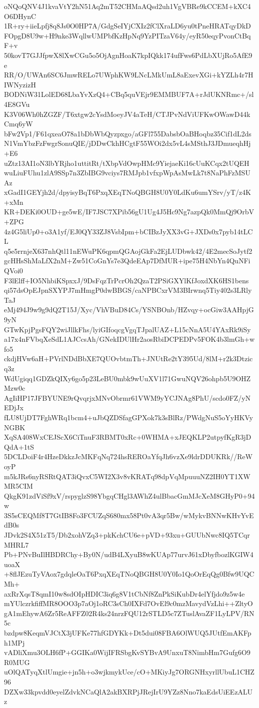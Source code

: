 oNQoQNV4J1kvaVtY2hN51Aq2mT52CHMaAQsd2uh1VgVBRe9kCCEM+kXC4O6DHynC
1R+ry+iieLpfj8q8Js0O0HP7A/GdgSeIYjCXIz2fClXraLD6yu0tPneHRATqyDkD
FOpgD8U9w+H9nke3WqllwUMPbfKzHpNq9YzPITzaV64y/eyR50eqyPvonCtBqF+v
50kovT7GJJfpwX8lXwCGu5o5OjAgnHoaK7kpIQkk174ufFws6PdLbXUjRo5AfE9e
RR/O/UWAn6SC6JmwRELo7UWphKW9LNcLMkUmL8aExevXGi+kYZLh4r7HIWNyzizH
BODNiW31LolED68LbaYvXzQ4+CBq5quVEjr9EMMBUF7A+rJdUKNRmc+/sl4E8GVu
K3V06Wh0hZGZF/T6xtgw2cYsdMoeyJV4aTeH/CTJPvNdViUFKwOWawD44kCmq6yW
bFw2Vp1/F61qxeaO78a1bDbWbQyzpxgo/aGFl755DabsbOaBHoqbz35Cif1dL2ds
N1VmYbzFzFwgrSonuQIE/jDDwCkhHCgtF55WOi2dx5vL4sMSthJ3JDmueqhHj+E6
uZtz13AI1oN3lbYRjho1uttitRt/tXbpVdOwpHMc9YiejaeKi16cUuKCqx2tUQEH
wuLiuFUhu1zlA9SSp7n3ZbIBG9vciys7RMJpb1vfxpWpAsMwLk7t8NaPhFzMSUAz
xGadI1GEYjh2d/dpyisyBqT6PxqXEqTNoQBGH8U0Y0LdKu6umYSrv/yT/z4K+xMn
KR+DEKi0OUD+ge5wE/IF7JSC7XPib56gU1Ug4J5Hc9Ng7azpQk0MmQj9OrbV+ZPG
4z4G5liUp0+o3A1yf/EJ0QY33ZJ8VsbIpm+bCIBzJyXX3vG+JXDs0x7pyb14tLCL
q5e5rrnjeX637nhQtl11nEWuPK6qpmQGAojGkFa2EjLUDbwk42/4E2mecSoJytf2
gcHHsShMaLfX2nM+Zw51CoGnYs7e3QdeEAp7DfMUR+ipe75H4NbYn4QuNFiQVoi0
F3lElff+IO5NhbiKSpxxJ/9DsFqzTrPcrOh2QzaT2PSiGXYlKfJoxdXK6HS1bens
qi57dsOpEJpnSXYPJ7mHmgP0dwBBGS/caNPBCxrVM3BIrwnq5Tiy402s3LRlyTaJ
eMj494J9w9g9dQ2T15J/Xyc/VhVBuD84Cs/YSNBOnb/HZvqy+ocGiw3AAHpjG9yN
GTwKpjPgsFQY2wiJllkFhs/lyiGIfoqcgVgqTJpalUAZ+L15cNnA5U4YAxRk9iSy
a17x4nFVbqXeSdL1AJCcsAh/GNekIDUlHr2aosRbiDCPEDPv5FOK4b3lmGh+wfo5
ckdjHVw6aH+PVrlNDdBbXE7QUOvbtmTh+JNUtRe2tY395Ud/8lM+r2k3Dtzicq3z
WdUgiqq1GDZkQIXy6go5p23LeBU0mbk9wUuXV1l71GwuNQV26ohpb5U9OHZMzw0c
AgIiHP17JFBYUNE9rQvqrjxMNvObrmr61VWM9yYCJNAg8PhU/scdo0FZ/yNEDjJx
fLU8UjDT7FghWRq1bcm4+uJbQZDSfagGPXok7k3sBlRz/PWdgNuS5oYyHKVyNGBK
XqSA408WxCEJScX6CiTnuF3RBMT0xRc+0WHMA+xJEQKLP2utpyfKgR3jDQdA+1tS
5DCLDoiF4r4HzeDkkzJcMKFqNq724hsREROaYfqJh6vzXe9ldrDDUKRk//ReWoyP
m5kJRs6nyRSRtQAT3iQvxC5WI2X3v8vKRATq98dpVqMpuuuNZ2IH0YT1XWMR5CIM
QkgK91zdViSf9xV/rspyglzS98YbgqCHgl3AWhZ4ulBbacGmMJcXeM8GHyP0+94w
3S5sCEQMf8T7GtIB8Fo3FCUZqS680mx58Pt0vA3qr5Bw/wMykvBNNwKHvYvEdB0s
JDvk2S4X51zT5/Db2xohVZq3+pkKchCU6e+pVD+93xu+GUUbNwc8IQ5TCqrMHRL7
Pb+PNvBuIlHBDRChy+By0N/udB4LXyuB8wKUAp77urvJ61xDbyfbozlKGIW4uoaX
+8flJEzuTyVAox7gdqleOaT6PxqXEqTNoQBGH8U0Y0Io1QoOrEqQg0Bfw9UQCMh+
axRrXqsT8qmI10w8sdOIpHDIC3iq6g8V1tCbNf8ZnPkSiKubDr4elYfjdo9z5w4e
mYUlczrkfiffMR8OOO3p7aOj1oRC3sCh0IXFd7OvEl9c0mzMavydVzLhi++ZltyO
gA1mEhywA6Zr5ReAFFZ02R4ks24nrzFQU12rSTLD5c7ZTuslAvaZF1LyLPV/RN5c
bzdpw8KeqmVJCtX3jUFKe77hfGDYKk+Dt5dui08FBA6OlWUQ5JUtfEmAKFph1MPj
vADliXmu3OLH6fP+GGIKa0WijIFRSbgKvSYBvA9UnxuT8NimbHm7Gufg6O9R0MUG
uOlQATyqXtlUmgie+jn5h+o3wjkmykUce/cO+MKiyJg7ORGNHxyrllUbuL1CHZ96
DZXw33kpvdd0eyelZdvkNCaQlA2akBXRPjJRejIrU9YZz8Nno7kaEdsUiEEzALUz
